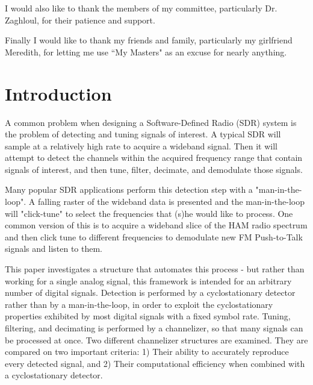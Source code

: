 \documentclass[12pt]{report}
\begin{document}
I would also like to thank the members of my committee, particularly Dr.
Zaghloul, for their patience and support.

Finally I would like to thank my friends and family, particularly my girlfriend
Meredith, for letting me use ``My Masters" as an excuse for nearly anything.

\tableofcontents
\pagebreak

\listoffigures
\pagebreak


\pagestyle{myheadings}

\chapter{Introduction}
\label{sec:intro}

A common problem when designing a Software-Defined Radio (SDR) system is the
problem of detecting and tuning signals of interest. A typical SDR will sample
at a relatively high rate to acquire a wideband signal. Then it will attempt to
detect the channels within the acquired frequency range that contain signals of
interest, and then tune, filter, decimate, and demodulate those signals. 

Many popular SDR applications perform this detection step with
a "man-in-the-loop".  A falling raster of the wideband data is presented and
the man-in-the-loop will "click-tune" to select  the frequencies that (s)he
would like to process. One common version of this is to acquire a wideband
slice of the HAM radio spectrum and then click tune to different frequencies to
demodulate new FM Push-to-Talk signals and listen to them.

This paper investigates a structure that automates this process - but rather
than working for a single analog signal, this framework is intended for an
arbitrary number of digital signals. Detection is performed by
a cyclostationary detector rather than by a man-in-the-loop, in order to
exploit the cyclostationary properties exhibited by most digital signals with
a fixed symbol rate.  Tuning, filtering, and decimating is performed by
a channelizer, so that many signals can be processed at once.  Two different
channelizer structures are examined. They are compared on two important
criteria:
1) Their ability to accurately reproduce every detected signal, and 2) Their
computational efficiency when combined with a cyclostationary detector.
\end{document}
